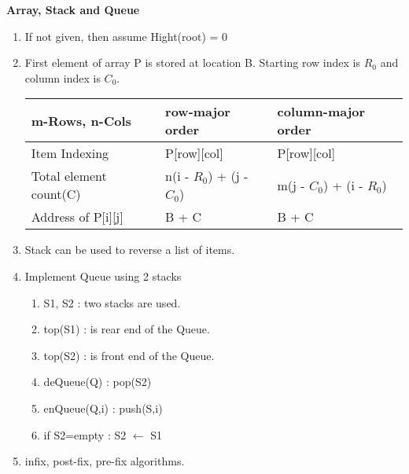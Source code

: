 
\centerline{\textbf{ \LARGE Array, Stack and Queue}}

\begin{enumerate}
    \item If not given, then assume Hight(root) = 0

    \item First element of array P is stored at location B. Starting row index is \(R_0\) and column index is \(C_0\).\\
    \begin{myTableStyle} \begin{tabular}{ |m{4cm}|m{4cm}|m{4cm}| } \hline
        m-Rows, n-Cols          & row-major order                        & column-major order \\ \hline
        Item Indexing           & P[row][col]                            & P[row][col]   \\ \hline
        Total element count(C)  & n(i - \( R_0 \)) + (j - \( C_0 \))     & m(j - \( C_0 \)) + (i - \( R_0 \))  \\ \hline
        Address of P[i][j]      & B + C                                  & B + C   \\ \hline
    \end{tabular} \end{myTableStyle} \vspace{0.08in}

    \item Stack can be used to reverse a list of items.

    \item Implement Queue using 2 stacks
    \begin{enumerate}
        \item S1, S2 : two stacks are used.
        \item top(S1) : is rear end of the Queue.
        \item top(S2) : is front end of the Queue.
        \item deQueue(Q) : pop(S2)
        \item enQueue(Q,i) : push(S,i)
        \item if S2=empty :  S2 \( \leftarrow \) S1
    \end{enumerate}

    \item infix, post-fix, pre-fix algorithms.

\end{enumerate}

